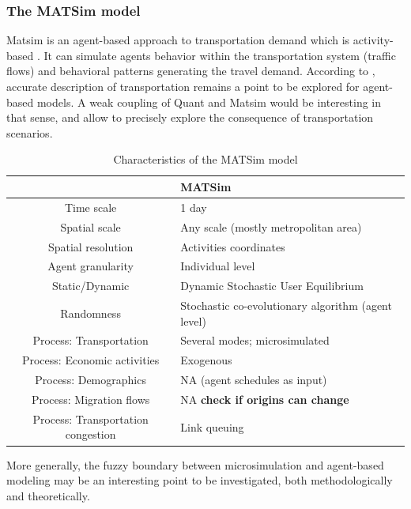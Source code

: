 \subsubsection{The MATSim model}

 Matsim is an agent-based approach to transportation demand which is activity-based \cite{horni2016multi}. It can simulate agents behavior within the transportation system (traffic flows) and behavioral patterns generating the travel demand. According to \cite{wise2016transportation}, accurate description of transportation remains a point to be explored for agent-based models. A weak coupling of Quant and Matsim would be interesting in that sense, and allow to precisely explore the consequence of transportation scenarios.

\begin{table}
\caption{Characteristics of the MATSim model}
\begin{tabular}{|c|p{6cm}|}
	\toprule
	& MATSim \\
	\midrule
Time scale & 1 day \\
Spatial scale & Any scale (mostly metropolitan area)\\
Spatial resolution & Activities coordinates \\
Agent granularity & Individual level \\
Static/Dynamic & Dynamic Stochastic User Equilibrium \\
Randomness & Stochastic co-evolutionary algorithm (agent level) \\
Process: Transportation & Several modes; microsimulated\\
Process: Economic activities & Exogenous \\
Process: Demographics & NA (agent schedules as input) \\
Process: Migration flows & NA \textbf{check if origins can change} \\
Process: Transportation congestion & Link queuing
\bottomrule
	\end{tabular}
\end{table}



 More generally, the fuzzy boundary between microsimulation and agent-based modeling may be an interesting point to be investigated, both methodologically and theoretically.











